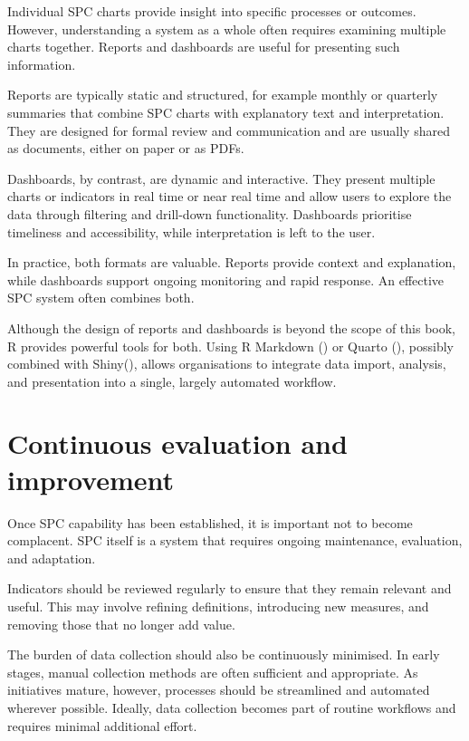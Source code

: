 \documentclass[
]{book}
\begin{document}
Individual SPC charts provide insight into specific processes or outcomes. However, understanding a system as a whole often requires examining multiple charts together. Reports and dashboards are useful for presenting such information.

Reports are typically static and structured, for example monthly or quarterly summaries that combine SPC charts with explanatory text and interpretation. They are designed for formal review and communication and are usually shared as documents, either on paper or as PDFs.

Dashboards, by contrast, are dynamic and interactive. They present multiple charts or indicators in real time or near real time and allow users to explore the data through filtering and drill-down functionality. Dashboards prioritise timeliness and accessibility, while interpretation is left to the user.

In practice, both formats are valuable. Reports provide context and explanation, while dashboards support ongoing monitoring and rapid response. An effective SPC system often combines both.

Although the design of reports and dashboards is beyond the scope of this book, R provides powerful tools for both. Using R Markdown () or Quarto (), possibly combined with Shiny(), allows organisations to integrate data import, analysis, and presentation into a single, largely automated workflow.

\section{Continuous evaluation and improvement}\label{continuous-evaluation-and-improvement}

Once SPC capability has been established, it is important not to become complacent. SPC itself is a system that requires ongoing maintenance, evaluation, and adaptation.

Indicators should be reviewed regularly to ensure that they remain relevant and useful. This may involve refining definitions, introducing new measures, and removing those that no longer add value.

The burden of data collection should also be continuously minimised. In early stages, manual collection methods are often sufficient and appropriate. As initiatives mature, however, processes should be streamlined and automated wherever possible. Ideally, data collection becomes part of routine workflows and requires minimal additional effort.
\end{document}
